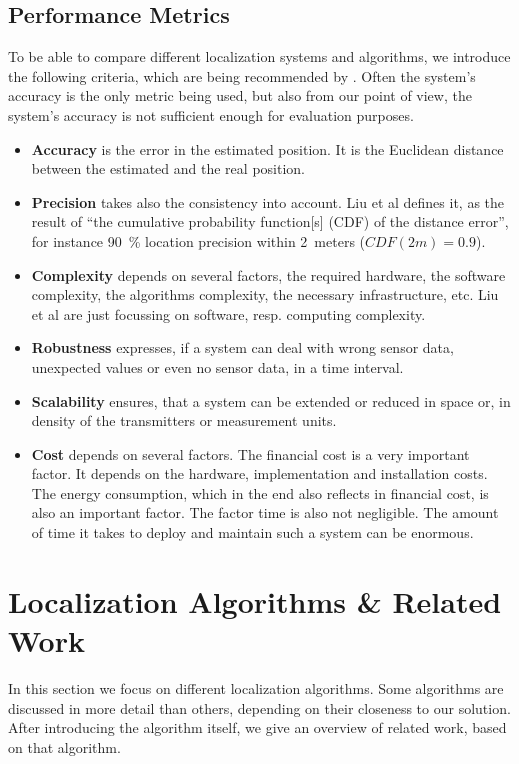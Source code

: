 \subsection{Performance Metrics}
To be able to compare different localization systems and algorithms, we introduce the following criteria, which are being recommended by \citet{IEEE:survey_wireless_indoor_pos}. Often the system's accuracy is the only metric being used, but also from our point of view, the system's accuracy is not sufficient enough for evaluation purposes.
\begin{itemize}
	\item \textbf{Accuracy} is the error in the estimated position. It is the Euclidean distance between the estimated and the real position.
	\item \textbf{Precision} takes also the consistency into account. Liu et al defines it, as the result of ``the cumulative probability function[s] (CDF) of the distance error'', for instance 90~\% location precision within 2~meters ($CDF(2m) = 0.9$).
	\item \textbf{Complexity} depends on several factors, the required hardware, the software complexity, the algorithms complexity, the necessary infrastructure, etc. Liu et al are just focussing on software, resp. computing complexity.
	\item \textbf{Robustness} expresses, if a system can deal with wrong sensor data, unexpected values or even no sensor data, in a time interval.
	\item \textbf{Scalability} ensures, that a system can be extended or reduced in space or, in density of the transmitters or measurement units.
	\item \textbf{Cost} depends on several factors. The financial cost is a very important factor. It depends on the hardware, implementation and installation costs. The energy consumption, which in the end also reflects in financial cost, is also an important factor. The factor time is also not negligible. The amount of time it takes to deploy and maintain such a system can be enormous.
\end{itemize}


\section{Localization Algorithms \& Related Work}
In this section we focus on different localization algorithms. Some algorithms are discussed in more detail than others, depending on their closeness to our solution. After introducing the algorithm itself, we give an overview of related work, based on that algorithm. 

